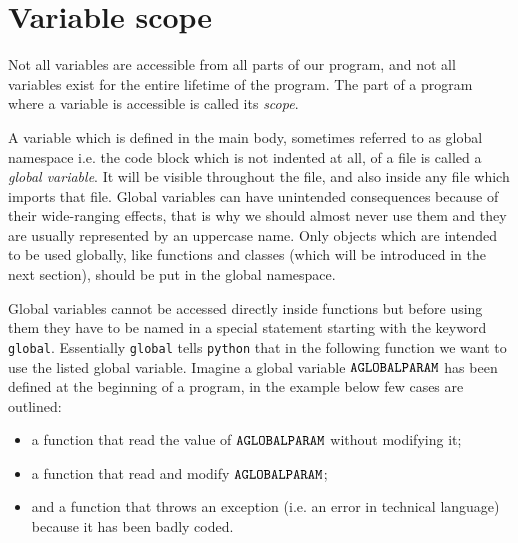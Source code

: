 \section{Variable scope}\label{advanced---variable-scope}

Not all variables are accessible from all parts of our program, and not all variables exist for the entire lifetime of the program. The part of a program where a variable is accessible is called its \emph{scope}.

A variable which is defined in the main body, sometimes referred to as global namespace i.e. the code block which is not indented at all, of a file is called a \emph{global variable}. It will be visible throughout the file, and also inside any file which imports that file. Global variables can have unintended consequences because of their wide-ranging effects, that is why we should almost never use them and they are usually represented by an uppercase name. Only objects which are intended to be used globally, like functions and classes (which will be introduced in the next section), should be put in the global namespace.

Global variables cannot be accessed directly inside functions but before using them they have to be named in a special statement starting with the keyword \texttt{global}. Essentially \texttt{global} tells \texttt{python} that in the following function we want to use the listed global variable.
Imagine a global variable $\tt{AGLOBALPARAM}$ has been defined at the beginning of a program, in the example below few cases are outlined:
\begin {itemize}
\item a function that read the value of $\tt{AGLOBALPARAM}$ without modifying it;
\item a function that read and modify $\tt{AGLOBALPARAM}$;
\item and a function that throws an exception (i.e. an error in technical language) because it has been badly coded.
\end{itemize}

